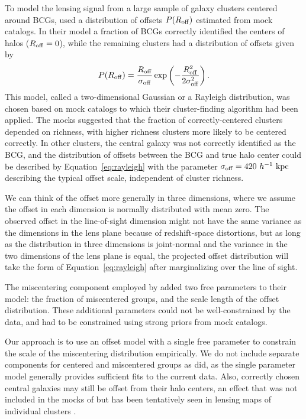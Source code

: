 \documentclass[12pt]{emulateapj}
\begin{document}
To model the lensing signal from a large sample of galaxy clusters
centered around BCGs, \citet{Johnston2007b} used a distribution of
offsets $P(R_{\rm off})$ estimated from mock catalogs. In their model
a fraction of BCGs correctly identified the centers of halos
($R_{\rm off}=0$), while the remaining clusters had a distribution of
offsets given by
\begin{equation}
P(R_{\rm off})=\frac{R_{\rm off}}{\sigma_{\rm off}}
\exp\left(-\frac{R_{\rm off}^2}{2 \sigma_{\rm off}^2}\right).
\label{eq:rayleigh}
\end{equation}
This model, called a two-dimensional Gaussian or a Rayleigh
distribution, was chosen based on mock catalogs to which their
cluster-finding algorithm had been applied. The mocks suggested
that the fraction of correctly-centered clusters depended on
richness, with higher richness clusters more likely to be centered
correctly. In other clusters, the central galaxy was not correctly
identified as the BCG, and the distribution of offsets between the BCG
and true halo center could be described by
Equation~\eqref{eq:rayleigh} with the parameter $\sigma_{\rm
  off}=420~h^{-1}~\rm{kpc}$ describing the typical offset scale,
independent of cluster richness.

We can think of the offset more generally in three dimensions, where
we assume the offset in each dimension is normally distributed with
mean zero. The observed offset in the line-of-sight dimension might
not have the same variance as the dimensions in the lens plane because
of redshift-space distortions, but as long as the distribution in
three dimensions is joint-normal and the variance in the two
dimensions of the lens plane is equal, the projected offset distribution
will take the form of Equation~\eqref{eq:rayleigh} after marginalizing
over the line of sight.

The miscentering component employed by \citet{Johnston2007b} added
two free parameters to their model: the fraction of miscentered
groups, and the scale length of the offset distribution. These
additional parameters could not be well-constrained by the data, and
had to be constrained using strong priors from mock catalogs.

Our approach is to use an offset model with a single free parameter to
constrain the scale of the miscentering distribution empirically.  We
do not include separate components for centered and miscentered groups
as \citet{Johnston2007b} did, as the single parameter model generally
provides sufficient fits to the current data. Also, correctly chosen central
galaxies may still be offset from their halo centers, an effect that
was not included in the mocks of \citet{Johnston2007b} but has been
tentatively seen in lensing maps of individual clusters
\citep{Oguri2010}. 
\end{document}
